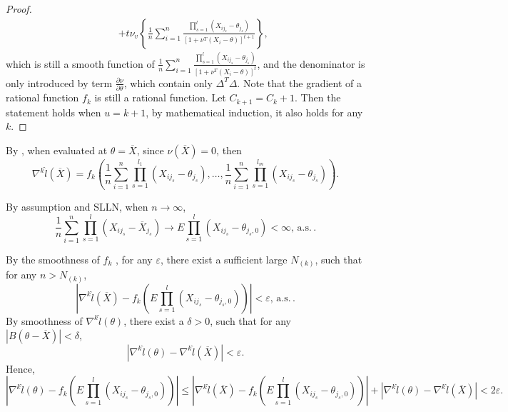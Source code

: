 \documentclass[oneside,english]{amsbook}
\numberwithin{section}{chapter}
\numberwithin{equation}{section}
\numberwithin{figure}{section}
\theoremstyle{plain}
\theoremstyle{plain}
\theoremstyle{definition}
\theoremstyle{plain}
\theoremstyle{plain}
\theoremstyle{remark}
\theoremstyle{definition}
\theoremstyle{definition}
\newcommand{\ascv}{\,\mathrm{a.s.}\,}
\begin{document}
\begin{proof}
\begin{eqnarray*}
 &  & +t\nu_{v}\left\{ \frac{1}{n}\sum_{i=1}^{n}\frac{\prod_{s=1}^{l}\left(X_{ij_{s}}-\theta_{j_{s}}\right)}{\left[1+\nu^{T}\left(X_{i}-\theta\right)\right]^{t+1}}\right\} ,
\end{eqnarray*}
which is still a smooth function of $\frac{1}{n}\sum_{i=1}^{n}\frac{\prod_{s=1}^{l}\left(X_{ij_{s}}-\theta_{j_{s}}\right)}{\left[1+\nu^{T}\left(X_{i}-\theta\right)\right]^{t}}$,
and the denominator is only introduced by term $\frac{\partial\nu}{\partial\theta}$,
which contain only $\Delta^{T}\Delta$. Note that the gradient of
a rational function $f_{k}$ is still a rational function. Let $C_{k+1}=C_{k}+1$.
Then the statement holds when $u=k+1$, by mathematical induction,
it also holds for any $k$. 
\end{proof}
By , when evaluated at
$\theta=\overline{X}$, since $\nu\left(\overline{X}\right)=0$, then
\[
\nabla^{k}\hat{l}\left(\overline{X}\right)=f_{k}\left(\frac{1}{n}\sum_{i=1}^{n}\prod_{s=1}^{l_{1}}\left(X_{ij_{s}}-\theta_{j_{s}}\right),\ldots,\frac{1}{n}\sum_{i=1}^{n}\prod_{s=1}^{l_{m}}\left(X_{ij_{s}}-\theta_{j_{s}}\right)\right).
\]

By assumption  and SLLN, when $n\rightarrow\infty$,
\[
\frac{1}{n}\sum_{i=1}^{n}\prod_{s=1}^{l}\left(X_{ij_{s}}-\overline{X}_{j_{s}}\right)\rightarrow E\prod_{s=1}^{l}\left(X_{ij_{s}}-\theta_{j_{s},0}\right)<\infty,\ascv.
\]

By the smoothness of $f_{k}$ , for any $\varepsilon$, there exist
a sufficient large $N_{\left(k\right)}$, such that for any $n>N_{\left(k\right)}$,
\[
\left|\nabla^{k}\hat{l}\left(\overline{X}\right)-f_{k}\left(E\prod_{s=1}^{l}\left(X_{ij_{s}}-\theta_{j_{s},0}\right)\right)\right|<\varepsilon,\ascv.
\]
By smoothness of $\nabla^{k}\hat{l}\left(\theta\right)$, there exist
a $\delta>0$, such that for any $\left|B\left(\theta-\overline{X}\right)\right|<\delta$,
\[
\left|\nabla^{k}\hat{l}\left(\theta\right)-\nabla^{k}\hat{l}\left(\overline{X}\right)\right|<\varepsilon.
\]
Hence, 
\[
\left|\nabla^{k}\hat{l}\left(\theta\right)-f_{k}\left(E\prod_{s=1}^{l}\left(X_{ij_{s}}-\theta_{j_{s},0}\right)\right)\right|\le\left|\nabla^{k}\hat{l}\left(\overline{X}\right)-f_{k}\left(E\prod_{s=1}^{l}\left(X_{ij_{s}}-\theta_{j_{s},0}\right)\right)\right|+\left|\nabla^{k}\hat{l}\left(\theta\right)-\nabla^{k}\hat{l}\left(\overline{X}\right)\right|<2\varepsilon.
\]
\end{document}
